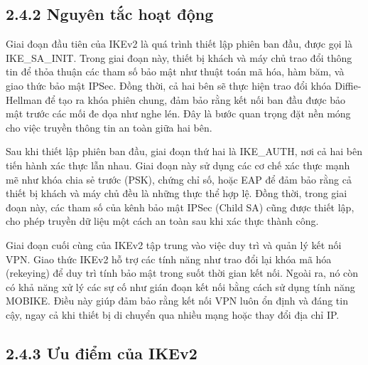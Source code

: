   \subsection*{2.4.2 Nguyên tắc hoạt động}

 Giai đoạn đầu tiên của IKEv2 là quá trình thiết lập phiên ban đầu, được gọi là IKE\_SA\_INIT. Trong giai đoạn này, thiết bị khách và máy chủ trao đổi thông tin để thỏa thuận các tham số bảo mật như thuật toán mã hóa, hàm băm, và giao thức bảo mật IPSec. Đồng thời, cả hai bên sẽ thực hiện trao đổi khóa Diffie-Hellman để tạo ra khóa phiên chung, đảm bảo rằng kết nối ban đầu được bảo mật trước các mối đe dọa như nghe lén. Đây là bước quan trọng đặt nền móng cho việc truyền thông tin an toàn giữa hai bên.

 Sau khi thiết lập phiên ban đầu, giai đoạn thứ hai là IKE\_AUTH, nơi cả hai bên tiến hành xác thực lẫn nhau. Giai đoạn này sử dụng các cơ chế xác thực mạnh mẽ như khóa chia sẻ trước (PSK), chứng chỉ số, hoặc EAP để đảm bảo rằng cả thiết bị khách và máy chủ đều là những thực thể hợp lệ. Đồng thời, trong giai đoạn này, các tham số của kênh bảo mật IPSec (Child SA) cũng được thiết lập, cho phép truyền dữ liệu một cách an toàn sau khi xác thực thành công.

 Giai đoạn cuối cùng của IKEv2 tập trung vào việc duy trì và quản lý kết nối VPN. Giao thức IKEv2 hỗ trợ các tính năng như trao đổi lại khóa mã hóa (rekeying) để duy trì tính bảo mật trong suốt thời gian kết nối. Ngoài ra, nó còn có khả năng xử lý các sự cố như gián đoạn kết nối bằng cách sử dụng tính năng MOBIKE. Điều này giúp đảm bảo rằng kết nối VPN luôn ổn định và đáng tin cậy, ngay cả khi thiết bị di chuyển qua nhiều mạng hoặc thay đổi địa chỉ IP.
 
  \subsection*{2.4.3 Ưu điểm của IKEv2}

